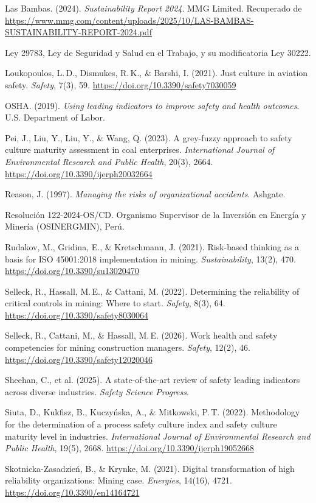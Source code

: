 \documentclass[12pt,a4paper]{article}
\begin{document}
Las Bambas. (2024). \textit{Sustainability Report 2024}. MMG Limited. Recuperado de \url{https://www.mmg.com/content/uploads/2025/10/LAS-BAMBAS-SUSTAINABILITY-REPORT-2024.pdf}

Ley 29783, Ley de Seguridad y Salud en el Trabajo, y su modificatoria Ley 30222.

Loukopoulos, L.\,D., Dismukes, R.\,K., \& Barshi, I. (2021). Just culture in aviation safety. \textit{Safety}, 7(3), 59. \url{https://doi.org/10.3390/safety7030059}

OSHA. (2019). \textit{Using leading indicators to improve safety and health outcomes}. U.S. Department of Labor.

Pei, J., Liu, Y., Liu, Y., \& Wang, Q. (2023). A grey-fuzzy approach to safety culture maturity assessment in coal enterprises. \textit{International Journal of Environmental Research and Public Health}, 20(3), 2664. \url{https://doi.org/10.3390/ijerph20032664}

Reason, J. (1997). \textit{Managing the risks of organizational accidents}. Ashgate.

Resolución 122-2024-OS/CD. Organismo Supervisor de la Inversión en Energía y Minería (OSINERGMIN), Perú.

Rudakov, M., Gridina, E., \& Kretschmann, J. (2021). Risk-based thinking as a basis for ISO 45001:2018 implementation in mining. \textit{Sustainability}, 13(2), 470. \url{https://doi.org/10.3390/su13020470}

Selleck, R., Hassall, M.\,E., \& Cattani, M. (2022). Determining the reliability of critical controls in mining: Where to start. \textit{Safety}, 8(3), 64. \url{https://doi.org/10.3390/safety8030064}

Selleck, R., Cattani, M., \& Hassall, M.\,E. (2026). Work health and safety competencies for mining construction managers. \textit{Safety}, 12(2), 46. \url{https://doi.org/10.3390/safety12020046}

Sheehan, C., et al. (2025). A state-of-the-art review of safety leading indicators across diverse industries. \textit{Safety Science Progress}.

Siuta, D., Kukfisz, B., Kuczy\'nska, A., \& Mitkowski, P.\,T. (2022). Methodology for the determination of a process safety culture index and safety culture maturity level in industries. \textit{International Journal of Environmental Research and Public Health}, 19(5), 2668. \url{https://doi.org/10.3390/ijerph19052668}

Skotnicka-Zasadzie\'n, B., \& Krynke, M. (2021). Digital transformation of high reliability organizations: Mining case. \textit{Energies}, 14(16), 4721. \url{https://doi.org/10.3390/en14164721}
\end{document}
